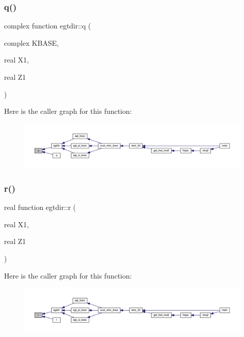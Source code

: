 \subsubsection{\texorpdfstring{q()}{q()}}
{\footnotesize\ttfamily complex function egtdir\+::q (\begin{DoxyParamCaption}\item[{complex}]{K\+B\+A\+SE,  }\item[{real}]{X1,  }\item[{real}]{Z1 }\end{DoxyParamCaption})}

Here is the caller graph for this function\+:\nopagebreak
\begin{figure}[H]
\begin{center}
\leavevmode
\includegraphics[width=350pt]{Leroi_8f90_a3849611a53bff318a7443ebea8b8b480_icgraph}
\end{center}
\end{figure}
\mbox{\label{Leroi_8f90_ab86561ed12c5864e44152801ef93c7c8}} 
\subsubsection{\texorpdfstring{r()}{r()}}
{\footnotesize\ttfamily real function egtdir\+::r (\begin{DoxyParamCaption}\item[{real}]{X1,  }\item[{real}]{Z1 }\end{DoxyParamCaption})}

Here is the caller graph for this function\+:\nopagebreak
\begin{figure}[H]
\begin{center}
\leavevmode
\includegraphics[width=350pt]{Leroi_8f90_ab86561ed12c5864e44152801ef93c7c8_icgraph}
\end{center}
\end{figure}
\mbox{\label{Leroi_8f90_a175215729f915283d0b8fb5dec72eb0a}} 
